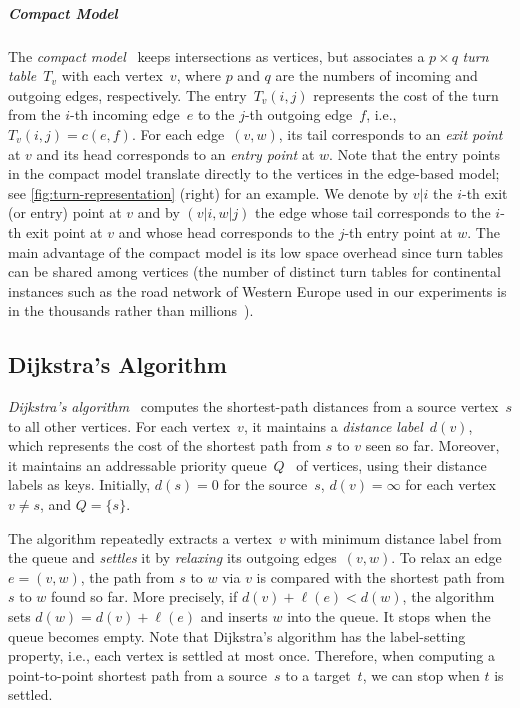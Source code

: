\documentclass[a4paper, english, cleveref]{lipics-v2021}
\begin{document}
\subparagraph*{Compact Model}

The \emph{compact model}~\cite{GeisbergerV11, DellingGPW17} keeps intersections as vertices, but associates a $p \times q$ \emph{turn table}~$T_v$ with each vertex~$v$, where $p$ and $q$ are the numbers of incoming and outgoing edges, respectively. The entry~$T_v(i, j)$ represents the cost of the turn from the $i$-th incoming edge~$e$ to the $j$-th outgoing edge~$f$, i.e., $T_v(i, j) = c(e, f)$. For each edge~$(v, w)$, its tail corresponds to an \emph{exit point} at $v$ and its head corresponds to an \emph{entry point} at $w$. Note that the entry points in the compact model translate directly to the vertices in the edge-based model; see \cref{fig:turn-representation} (right) for an example. We denote by $v|i$ the $i$-th exit (or entry) point at $v$ and by $(v|i, w|j)$ the edge whose tail corresponds to the $i$-th exit point at $v$ and whose head corresponds to the $j$-th entry point at $w$. The main advantage of the compact model is its low space overhead since turn tables can be shared among vertices (the number of distinct turn tables for continental instances such as the road network of Western Europe used in our experiments is in the thousands rather than millions~\cite{DellingGPW17}).

\subsection{Dijkstra's Algorithm}

\emph{Dijkstra's algorithm}~\cite{Dijkstra59} computes the shortest-path distances from a source vertex~$s$ to all other vertices. For each vertex~$v$, it maintains a \emph{distance label}~$d(v)$, which represents the cost of the shortest path from $s$ to $v$ seen so far. Moreover, it maintains an addressable priority queue~$Q$~\cite{SandersMDD19} of vertices, using their distance labels as keys. Initially, $d(s) = 0$ for the source~$s$, $d(v) = \infty$ for each vertex~$v \ne s$, and $Q = \{s\}$.

The algorithm repeatedly extracts a vertex~$v$ with minimum distance label from the queue and \emph{settles} it by \emph{relaxing} its outgoing edges~$(v, w)$. To relax an edge~$e = (v, w)$, the path from $s$ to $w$ via $v$ is compared with the shortest path from $s$ to $w$ found so far. More precisely, if $d(v) + \ell(e) < d(w)$, the algorithm sets $d(w) = d(v) + \ell(e)$ and inserts $w$ into the queue. It stops when the queue becomes empty. Note that Dijkstra's algorithm has the label-setting property, i.e., each vertex is settled at most once. Therefore, when computing a point-to-point shortest path from a source~$s$ to a target~$t$, we can stop when $t$ is settled.
\end{document}
